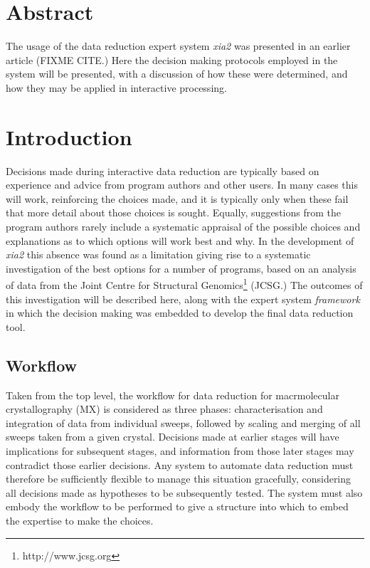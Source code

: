 \documentclass[a4paper,11pt]{article}
\begin{document}
\section{Abstract}

The usage of the data reduction expert system \emph{xia2} was
presented in an earlier article (FIXME CITE.) Here the decision making
protocols employed in the system will be presented, with a discussion
of how these were determined, and how they may be applied in interactive
processing. 

\section{Introduction}

Decisions made during interactive data reduction are typically based
on experience and advice from program authors and other users. In many
cases this will work, reinforcing the choices made, and it is typically
only when these fail that more detail about those choices is
sought. Equally, suggestions from the program authors rarely include a
systematic appraisal of the possible choices and explanations as to
which options will work best and why. 
In the development of \emph{xia2} this absence was found
as a limitation giving rise to a systematic investigation of the best
options for a number of programs, 
based on an analysis of data from the Joint Centre
for Structural Genomics\footnote{http://www.jcsg.org} (JCSG.) The
outcomes of this investigation will be described here, along with the
expert system \emph{framework} in which the decision making was
embedded to develop the final data reduction tool.

\subsection{Workflow}

Taken from the top level, the workflow for data reduction for
macrmolecular crystallography (MX) is considered as three phases:
characterisation and integration of data from individual sweeps,
followed by scaling and merging of all sweeps taken from a given
crystal. Decisions made at earlier stages will have implications for
subsequent stages, and information from those later stages may
contradict those earlier decisions. Any system to automate data
reduction must therefore be sufficiently flexible to manage this
situation gracefully, considering all decisions made as hypotheses to
be subsequently tested. The system must also embody the workflow to be
performed to give a structure into which to embed the expertise to
make the choices. 
\end{document}
